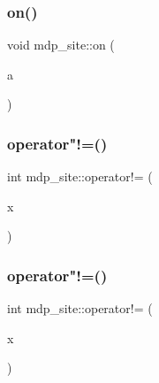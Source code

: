 \mbox{\label{classmdp__site_a6342ca7fb3edaef8b09854ca98399fa4}} 
\subsubsection{\texorpdfstring{on()}{on()}}
{\footnotesize\ttfamily void mdp\+\_\+site\+::on (\begin{DoxyParamCaption}\item[{const \hyperlink{classmdp__lattice}{mdp\+\_\+lattice} \&}]{a }\end{DoxyParamCaption})\hspace{0.3cm}{\ttfamily [inline]}}

\mbox{\label{classmdp__site_af393fef955cb91629ece72746a582236}} 
\subsubsection{\texorpdfstring{operator"!=()}{operator!=()}\hspace{0.1cm}{\footnotesize\ttfamily [1/2]}}
{\footnotesize\ttfamily int mdp\+\_\+site\+::operator!= (\begin{DoxyParamCaption}\item[{\hyperlink{classmdp__site}{mdp\+\_\+site}}]{x }\end{DoxyParamCaption})\hspace{0.3cm}{\ttfamily [inline]}}

\mbox{\label{classmdp__site_a424ed9f2670e12a0a3fe521070fc5d41}} 
\subsubsection{\texorpdfstring{operator"!=()}{operator!=()}\hspace{0.1cm}{\footnotesize\ttfamily [2/2]}}
{\footnotesize\ttfamily int mdp\+\_\+site\+::operator!= (\begin{DoxyParamCaption}\item[{int $\ast$}]{x }\end{DoxyParamCaption})\hspace{0.3cm}{\ttfamily [inline]}}

